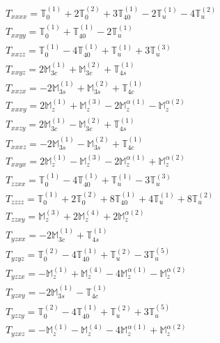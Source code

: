 \documentclass[fleqn,8pt,landscape]{jsarticle}
\begin{document}
\begin{align*}
& T_{xxxx} = \mathbb{T}_{0}^{(1)} + 2 \mathbb{T}_{0}^{(2)} + 3 \mathbb{T}_{40}^{(1)} - 2 \mathbb{T}_{u}^{(1)} - 4 \mathbb{T}_{u}^{(2)} \\
& T_{xxyy} = \mathbb{T}_{0}^{(1)} + \mathbb{T}_{40}^{(1)} - 2 \mathbb{T}_{u}^{(1)} \\
& T_{xxzz} = \mathbb{T}_{0}^{(1)} - 4 \mathbb{T}_{40}^{(1)} + \mathbb{T}_{u}^{(1)} + 3 \mathbb{T}_{u}^{(3)} \\
& T_{xxyz} = 2 \mathbb{M}_{3c}^{(1)} + \mathbb{M}_{3c}^{(2)} + \mathbb{T}_{4s}^{(1)} \\
& T_{xxzx} = - 2 \mathbb{M}_{3s}^{(1)} + \mathbb{M}_{3s}^{(2)} + \mathbb{T}_{4c}^{(1)} \\
& T_{xxxy} = 2 \mathbb{M}_{z}^{(1)} + \mathbb{M}_{z}^{(3)} - 2 \mathbb{M}_{z}^{\alpha(1)} - \mathbb{M}_{z}^{\alpha(2)} \\
& T_{xxzy} = 2 \mathbb{M}_{3c}^{(1)} - \mathbb{M}_{3c}^{(2)} + \mathbb{T}_{4s}^{(1)} \\
& T_{xxxz} = - 2 \mathbb{M}_{3s}^{(1)} - \mathbb{M}_{3s}^{(2)} + \mathbb{T}_{4c}^{(1)} \\
& T_{xxyx} = 2 \mathbb{M}_{z}^{(1)} - \mathbb{M}_{z}^{(3)} - 2 \mathbb{M}_{z}^{\alpha(1)} + \mathbb{M}_{z}^{\alpha(2)} \\
& T_{zzxx} = \mathbb{T}_{0}^{(1)} - 4 \mathbb{T}_{40}^{(1)} + \mathbb{T}_{u}^{(1)} - 3 \mathbb{T}_{u}^{(3)} \\
& T_{zzzz} = \mathbb{T}_{0}^{(1)} + 2 \mathbb{T}_{0}^{(2)} + 8 \mathbb{T}_{40}^{(1)} + 4 \mathbb{T}_{u}^{(1)} + 8 \mathbb{T}_{u}^{(2)} \\
& T_{zzxy} = \mathbb{M}_{z}^{(3)} + 2 \mathbb{M}_{z}^{(4)} + 2 \mathbb{M}_{z}^{\alpha(2)} \\
& T_{yzxx} = - 2 \mathbb{M}_{3c}^{(1)} + \mathbb{T}_{4s}^{(1)} \\
& T_{yzyz} = \mathbb{T}_{0}^{(2)} - 4 \mathbb{T}_{40}^{(1)} + \mathbb{T}_{u}^{(2)} - 3 \mathbb{T}_{u}^{(5)} \\
& T_{yzzx} = - \mathbb{M}_{z}^{(1)} + \mathbb{M}_{z}^{(4)} - 4 \mathbb{M}_{z}^{\alpha(1)} - \mathbb{M}_{z}^{\alpha(2)} \\
& T_{yzxy} = - 2 \mathbb{M}_{3s}^{(1)} - \mathbb{T}_{4c}^{(1)} \\
& T_{yzzy} = \mathbb{T}_{0}^{(2)} - 4 \mathbb{T}_{40}^{(1)} + \mathbb{T}_{u}^{(2)} + 3 \mathbb{T}_{u}^{(5)} \\
& T_{yzxz} = - \mathbb{M}_{z}^{(1)} - \mathbb{M}_{z}^{(4)} - 4 \mathbb{M}_{z}^{\alpha(1)} + \mathbb{M}_{z}^{\alpha(2)}
\end{align*}
\end{document}
